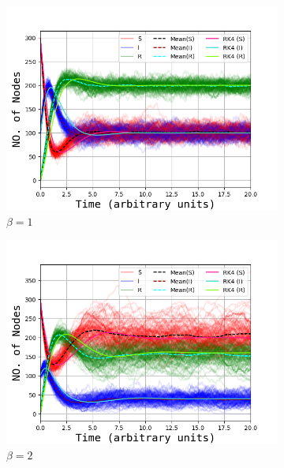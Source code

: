 \begin{figure}[H]
		\centering
		\begin{subfigure}{0.49\linewidth}
			\includegraphics[width=1.1\linewidth]{Figures/OppgA_4_1_05.png}
			\caption{$\beta = 1$}
		\end{subfigure}
		\begin{subfigure}{0.49\linewidth}
			\includegraphics[width=1.1\linewidth]{Figures/OppgA_4_2_05.png}
			\caption{$\beta = 2$}
		\end{subfigure}
		\begin{subfigure}{0.49\linewidth}

\end{subfigure}
\end{figure}
